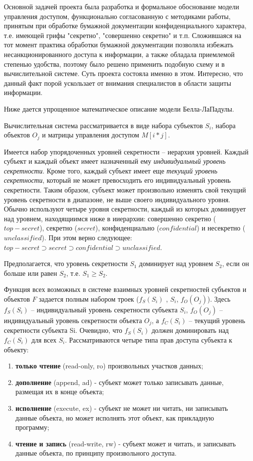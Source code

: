 Основной задачей проекта была разработка и формальное обоснование модели управления доступом, функционально согласованную с методиками работы, принятым при обработке бумажной документации конфиденциального характера, т.е. имеющей грифы "секретно", "совершенно секретно" и т.п. Сложившаяся на тот момент практика обработки бумажной документации позволяла избежать несанкционированного доступа к информации, а также обладала приемлемой степенью удобства, поэтому было решено применить подобную схему и в вычислительной системе. Суть проекта состояла именно в этом. Интересно, что данный факт порой ускользает от внимания специалистов в области защиты информации. 

Ниже дается упрощенное математическое описание модели Белла-ЛаПадулы.

Вычислительная система рассматривается в виде набора субъектов $S_{i}$, набора объектов $O_{j}$ и матрицы управления доступом $M[i*j]$. 

Имеется набор упорядоченных уровней секретности -- иерархия уровней. Каждый субъект и каждый объект имеет назначенный ему \textit{индивидуальный уровень секретности}. Кроме того, каждый субъект имеет еще \textit{текущий уровень секретности}, который не может превосходить его индивидуальный уровень секретности. Таким образом, субъект может произвольно изменять свой текущий уровень секретности в диапазоне, не выше своего индивидуального уровня. Обычно используют четыре уровня секретности, каждый из которых доминирует над уровнем, находящиимся ниже в ииерархии: совершенно секретно ($top-secret$),  секретно ($secret$),  конфиденциально ($confidential$) и несекретно ($unclassified$).  При этом верно следующее: $ top-secret \supset secret \supset confidential \supset unclassified $. 

Предполагается, что уровень секретности $S_1$ доминирует над уровнем $S_2$, если он больше или равен $S_2$, т.е. $S_1 \geq S_2$.

Функция всех возможных в системе взаимных уровней секретностей субъектов и объектов $F$ задается полным набором троек ($f_S(S_i)$ , $S_i$, $f_O(O_j)$). Здесь $f_S(S_i)$ – индивидуальный уровень секретности субъекта $S_i$, $f_O(O_j)$ – индивидуальный уровень секретности объекта $O_j$, а $f_C(S_i)$ – текущий уровень секретности субъекта Si. Очевидно, что $f_S(S_i)$ должен доминировать над $f_C(S_i)$ для всех $S_i$. Рассматриваются четыре типа прав доступа субъекта к объекту: 

\begin{enumerate}
	\item\textbf{только чтение} (read-only, ro) произвольных участков данных; 
	\item\textbf{дополнение} (append, ad) - субъект может только записывать данные, размещая их в конце объекта; 
	\item\textbf{исполнение} (execute, ex) - субъект не может ни читать, ни записывать данные объекта, но может исполнять этот объект, как прикладную программу; 
	\item\textbf{чтение и запись} (read-write, rw) - субъект может и читать, и записывать данные объекта, по принципу произвольного доступа. 
\end{enumerate}

